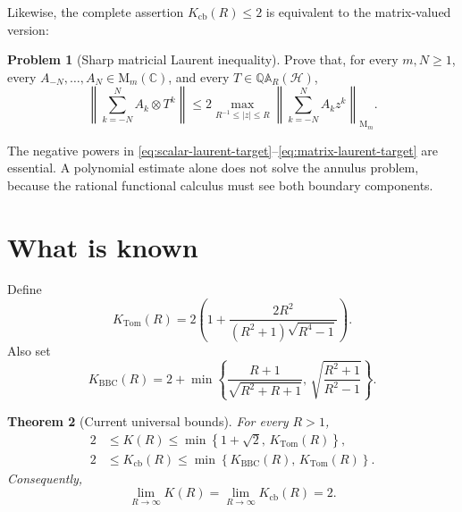 \documentclass[11pt]{article}
\newtheorem{theorem}{Theorem}[section]
\theoremstyle{definition}
\newtheorem{problem}[theorem]{Problem}
\theoremstyle{remark}
\newcommand{\C}{\mathbb C}
\newcommand{\QAR}{\mathbb Q\mathbb A_R}
\newcommand{\cb}{\mathrm{cb}}
\newcommand{\Mat}{\mathrm M}
\begin{document}
Likewise, the complete assertion \(K_{\cb}(R)\leq2\) is equivalent to
the matrix-valued version:
\begin{problem}[Sharp matricial Laurent inequality]
\label{prob:matrix-laurent}
Prove that, for every \(m,N\geq1\), every
\(A_{-N},\ldots,A_N\in\Mat_m(\C)\), and every
\(T\in\QAR(\mathcal H)\),
\begin{equation}
 \left\|
  \sum_{k=-N}^{N}A_k\otimes T^k
 \right\|
 \leq
 2
 \max_{R^{-1}\leq|z|\leq R}
 \left\|
  \sum_{k=-N}^{N}A_kz^k
 \right\|_{\Mat_m}.
 \label{eq:matrix-laurent-target}
\end{equation}
\end{problem}

The negative powers in
\eqref{eq:scalar-laurent-target}--\eqref{eq:matrix-laurent-target}
are essential.  A polynomial estimate alone does not solve the
annulus problem, because the rational functional calculus must see
both boundary components.

\section{What is known}

Define
\begin{equation}
 K_{\mathrm{Tom}}(R)
 =
 2\left(
  1+
  \frac{2R^2}
  {(R^2+1)\sqrt{R^4-1}}
 \right).
 \label{eq:Tomar-bound}
\end{equation}
Also set
\begin{equation}
 K_{\mathrm{BBC}}(R)
 =
 2+
 \min\left\{
 \frac{R+1}{\sqrt{R^2+R+1}},\,
 \sqrt{\frac{R^2+1}{R^2-1}}
 \right\}.
 \label{eq:BBC-bound}
\end{equation}

\par\medskip
\begin{theorem}[Current universal bounds]
\label{thm:known-universal-bounds}
For every \(R>1\),
\begin{align}
 2
 &\leq K(R)
 \leq
 \min\left\{
  1+\sqrt2,\,
  K_{\mathrm{Tom}}(R)
 \right\},
 \label{eq:scalar-bounds}\\
 2
 &\leq K_{\cb}(R)
 \leq
 \min\left\{
  K_{\mathrm{BBC}}(R),\,
  K_{\mathrm{Tom}}(R)
 \right\}.
 \label{eq:complete-bounds}
\end{align}
Consequently,
\begin{equation}
 \lim_{R\to\infty}K(R)
 =
 \lim_{R\to\infty}K_{\cb}(R)
 =2.
 \label{eq:asymptotic-two}
\end{equation}
\end{theorem}
\end{document}
